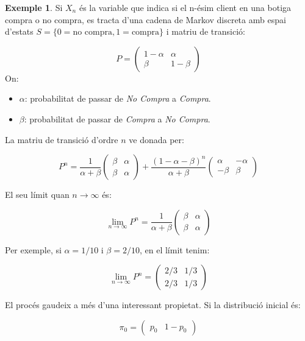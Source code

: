 \documentclass[
  catalan,
]{article}
\theoremstyle{definition}
\theoremstyle{definition}
\newtheorem{example}{Exemple}[section]
\theoremstyle{definition}
\theoremstyle{definition}
\theoremstyle{remark}
\begin{document}
\begin{example}
\protect\hypertarget{exm:dequilibri}{}\label{exm:dequilibri}Si \(X_n\) és la variable que indica si el n-ésim client en una botiga compra o no compra, es tracta d'una cadena de Markov discreta amb espai d'estats \(S = \{0=\text{no compra}, 1=\text{compra} \}\) i matriu de transició:

\[P = \begin{pmatrix} 1 - \alpha & \alpha \\ \beta & 1 - \beta \end{pmatrix}\]
On:

\begin{itemize}
\item
  \(\alpha\): probabilitat de passar de \emph{No Compra} a \emph{Compra}.
\item
  \(\beta\): probabilitat de passar de \emph{Compra} a \emph{No Compra}.
\end{itemize}

La matriu de transició d'ordre \(n\) ve donada per:

\[P^n = \frac{1}{\alpha + \beta} \begin{pmatrix} \beta & \alpha \\ \beta & \alpha \end{pmatrix} + \frac{(1 - \alpha - \beta)^n}{\alpha + \beta} \begin{pmatrix} \alpha & -\alpha \\ -\beta & \beta \end{pmatrix}\]

El seu límit quan \(n \to \infty\) és:

\[\lim_{n \to \infty} P^n = \frac{1}{\alpha + \beta} \begin{pmatrix} \beta & \alpha \\ \beta & \alpha \end{pmatrix}\]

Per exemple, si \(\alpha = 1/10\) i \(\beta = 2/10\), en el límit tenim:

\[\lim_{n \to \infty} P^n = \begin{pmatrix} 2/3 & 1/3 \\ 2/3 & 1/3 \end{pmatrix}\]

El procés gaudeix a més d'una interessant propietat. Si la distribució inicial és:

\[\pi_0 = \begin{pmatrix} p_0 & 1 - p_0 \end{pmatrix}\]


\end{example}
\end{document}
